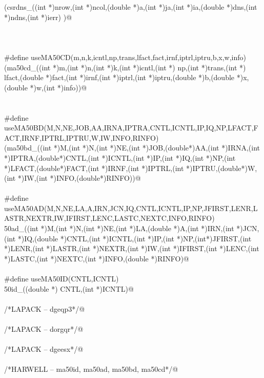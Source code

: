 \documentclass[12pt]{article}
\begin{document}
\begin{flushleft}
\begin{minipage}{\linewidth}
\begin{list}{}{}
\mbox{}\verb@(csrdns_((int *)nrow,(int *)ncol,(double *)a,(int *)ja,(int *)ia,(double *)dns,(int *)ndns,(int *)ierr) )@\\
\mbox{}\verb@@\\
\mbox{}\verb@@\\
\mbox{}\verb@@\\
\mbox{}\verb@#define useMA50CD(m,n,k,icntl,np,trans,lfact,fact,irnf,iptrl,iptru,b,x,w,info)\@\\
\mbox{}\verb@(ma50cd_((int *)m,(int *)n,(int *)k,(int *)icntl,(int *) np,(int *)trans,(int *) lfact,(double *)fact,(int *)irnf,(int *)iptrl,(int *)iptru,(double *)b,(double *)x,(double *)w,(int *)info))@\\
\mbox{}\verb@@\\
\mbox{}\verb@@\\
\mbox{}\verb@#define useMA50BD(M,N,NE,JOB,AA,IRNA,IPTRA,CNTL,ICNTL,IP,IQ,NP,LFACT,FACT,IRNF,IPTRL,IPTRU,W,IW,INFO,RINFO)\@\\
\mbox{}\verb@(ma50bd_((int *)M,(int *)N,(int *)NE,(int *)JOB,(double*)AA,(int *)IRNA,(int *)IPTRA,(double*)CNTL,(int *)ICNTL,(int *)IP,(int *)IQ,(int *)NP,(int *)LFACT,(double*)FACT,(int *)IRNF,(int *)IPTRL,(int *)IPTRU,(double*)W,(int *)IW,(int *)INFO,(double*)RINFO))@\\
\mbox{}\verb@@\\
\mbox{}\verb@#define useMA50AD(M,N,NE,LA,A,IRN,JCN,IQ,CNTL,ICNTL,IP,NP,JFIRST,LENR,LASTR,NEXTR,IW,IFIRST,LENC,LASTC,NEXTC,INFO,RINFO)\@\\
\mbox{}\verb@ma50ad_((int *)M,(int *)N,(int *)NE,(int *)LA,(double *)A,(int *)IRN,(int *)JCN,(int *)IQ,(double *)CNTL,(int *)ICNTL,(int *)IP,(int *)NP,(int*)JFIRST,(int *)LENR,(int *)LASTR,(int *)NEXTR,(int *)IW,(int *)IFIRST,(int *)LENC,(int *)LASTC,(int *)NEXTC,(int *)INFO,(double *)RINFO)@\\
\mbox{}\verb@@\\
\mbox{}\verb@#define useMA50ID(CNTL,ICNTL)\@\\
\mbox{}\verb@ma50id_((double *) CNTL,(int *)ICNTL)@\\
\mbox{}\verb@@\\
\mbox{}\verb@/*LAPACK -- dgeqp3*/@\\
\mbox{}\verb@@\\
\mbox{}\verb@/*LAPACK -- dorgqr*/@\\
\mbox{}\verb@@\\
\mbox{}\verb@/*LAPACK -- dgeesx*/@\\
\mbox{}\verb@@\\
\mbox{}\verb@/*HARWELL -- ma50id, ma50ad, ma50bd, ma50cd*/@\\

\end{list}
\end{minipage}
\end{flushleft}
\end{document}
